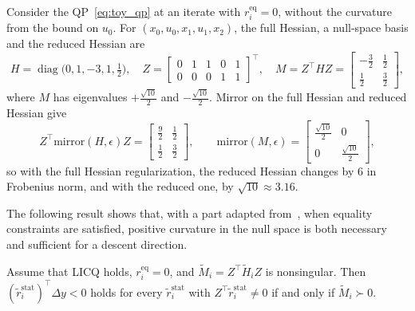 \documentclass[class=scrbook, crop=false]{standalone}
\begin{document}
\begin{example}
\label{ex:full_vs_reduced}
Consider the \gls{QP}~\eqref{eq:toy_qp} at an iterate with $r_i^{\mathrm{eq}} = 0$, 
without the curvature from the bound on $u_0$.
For $(x_0,u_0,x_1,u_1,x_2)$, the full Hessian, a null-space basis and the reduced Hessian are
\begin{equation*}
    H = \operatorname{diag}\bigl(0, 1, -3, 1, \tfrac{1}{2}\bigr), \quad
    Z = \begin{bmatrix} 0 & 1 & 1 & 0 & 1 \\ 0 & 0 & 0 & 1 & 1 \end{bmatrix}^\top, \quad
    M = Z^\top H Z = \begin{bmatrix} -\tfrac{3}{2} & \tfrac{1}{2} \\[2pt] \tfrac{1}{2} & \tfrac{3}{2} \end{bmatrix},
\end{equation*}
where $M$ has eigenvalues $+\tfrac{\sqrt{10}}{2}$ and $-\tfrac{\sqrt{10}}{2}$.
Mirror on the full Hessian and reduced Hessian give
\begin{equation*}
    Z^\top \mathrm{mirror}(H, \epsilon) Z = \begin{bmatrix} \tfrac{9}{2} & \tfrac{1}{2} \\[2pt] \tfrac{1}{2} & \tfrac{3}{2} \end{bmatrix},
    \qquad
    \mathrm{mirror}(M, \epsilon) = \begin{bmatrix} \tfrac{\sqrt{10}}{2} & 0 \\[2pt] 0 & \tfrac{\sqrt{10}}{2} \end{bmatrix},
\end{equation*}
so with the full Hessian regularization, 
the reduced Hessian changes by $6$ in Frobenius norm,
and with the reduced one, by $\sqrt{10} \approx 3.16$.
\end{example}

The following result shows that, with a part adapted from~\cite{nocedal2006numerical},
when equality constraints are satisfied,
positive curvature in the null space is both necessary and sufficient for a descent direction.

\begin{theorem}
    \label{thm:reduced_hessian_descent}
    Assume that \gls{LICQ} holds, $r_i^{\mathrm{eq}} = 0$, and $\tilde{M}_i = Z^\top \tilde{H}_i Z$ is nonsingular.
    Then $(\tilde{r}_i^{\mathrm{stat}})^\top \Delta y < 0$ holds for every $\tilde{r}_i^{\mathrm{stat}}$
    with $Z^\top \tilde{r}_i^{\mathrm{stat}} \neq 0$ if and only if $\tilde{M}_i \succ 0$.
\end{theorem}
\end{document}
